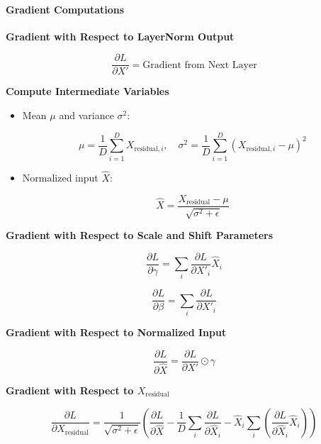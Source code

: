 \documentclass{article}
\begin{document}
\paragraph{Gradient Computations}

\textbf{Gradient with Respect to LayerNorm Output}

\begin{equation}
    \frac{\partial L}{\partial X'} = \text{Gradient from Next Layer}
\end{equation}

\textbf{Compute Intermediate Variables}

\begin{itemize}
    \item Mean $\mu$ and variance $\sigma^2$:

    \begin{equation}
        \mu = \frac{1}{D} \sum_{i=1}^{D} X_{\text{residual}, i}, \quad \sigma^2 = \frac{1}{D} \sum_{i=1}^{D} \left( X_{\text{residual}, i} - \mu \right)^2
    \end{equation}

    \item Normalized input $\hat{X}$:

    \begin{equation}
        \hat{X} = \frac{X_{\text{residual}} - \mu}{\sqrt{\sigma^2 + \epsilon}}
    \end{equation}
\end{itemize}

\textbf{Gradient with Respect to Scale and Shift Parameters}

\begin{equation}
    \frac{\partial L}{\partial \gamma} = \sum_{i} \frac{\partial L}{\partial X'_i} \hat{X}_i
\end{equation}

\begin{equation}
    \frac{\partial L}{\partial \beta} = \sum_{i} \frac{\partial L}{\partial X'_i}
\end{equation}

\textbf{Gradient with Respect to Normalized Input}

\begin{equation}
    \frac{\partial L}{\partial \hat{X}} = \frac{\partial L}{\partial X'} \odot \gamma
\end{equation}

\textbf{Gradient with Respect to $X_{\text{residual}}$}

\begin{equation}
    \frac{\partial L}{\partial X_{\text{residual}}} = \frac{1}{\sqrt{\sigma^2 + \epsilon}} \left( \frac{\partial L}{\partial \hat{X}} - \frac{1}{D} \sum_{i} \frac{\partial L}{\partial \hat{X}_i} - \hat{X}_i \sum_{i} \left( \frac{\partial L}{\partial \hat{X}_i} \hat{X}_i \right) \right)
\end{equation}
\end{document}
